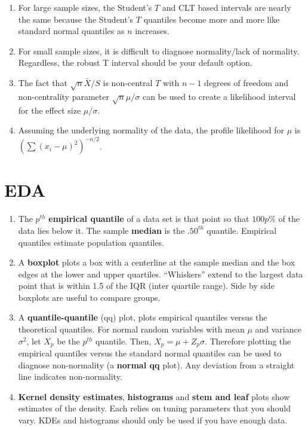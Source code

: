 \documentclass[12pt]{article}
\begin{document}
\begin{enumerate}[1.]
\item For large sample sizes, the Student's $T$ and CLT based intervals are
  nearly the same because the Student's $T$ quantiles become more and more
  like standard normal quantiles as $n$ increases.
\item For small sample sizes, it is difficult to diagnose normality/lack of normality.
  Regardless, the robust T interval should be your default option.
\item The fact that $\sqrt{n} \bar X / S $ is non-central $T$ with 
  $n-1$ degrees of freedom and non-centrality parameter $\sqrt{n}\mu/\sigma$ can be
  used to create a likelihood interval for the effect size $\mu / \sigma$.
\item Assuming the underlying normality of the data, 
  the profile likelihood for $\mu$ is $\left(\sum (x_i - \mu)^2\right)^{-n/2}$.
\end{enumerate}

\section{EDA}
\begin{enumerate}[1.]
\item The $p^{th}$ {\bf empirical quantile} of a data set is that
  point so that $100p\%$ of the data lies below it. The sample {\bf
    median} is the $.50^{th}$ quantile. Empirical quantiles estimate
  population quantiles.
\item A {\bf boxplot} plots a box with a centerline at the sample median
  and the box edges at the lower and upper quartiles. ``Whiskers'' extend
  to the largest data point that is within 1.5 of the IQR (inter quartile range). Side
  by side boxplots are useful to compare groups.
\item A {\bf quantile-quantile} (qq) plot, plots empirical quantiles
  versus the theoretical quantiles. For normal random variables with
  mean $\mu$ and variance $\sigma^2$, let $X_p$ be the $p^{th}$ 
  quantile. Then, $X_p = \mu + Z_p \sigma$. Therefore plotting the empirical
  quantiles versus the standard normal quantiles can be used to diagnose
  non-normality (a {\bf normal qq} plot). Any deviation from a straight line
  indicates non-normality.
\item {\bf Kernel density estimates}, {\bf histograms} and {\bf stem and leaf}
  plots show estimates of the density. Each relies on tuning parameters that 
  you should vary. KDEs and histograms should only be used if you have enough
  data.
\end{enumerate}
\end{document}
